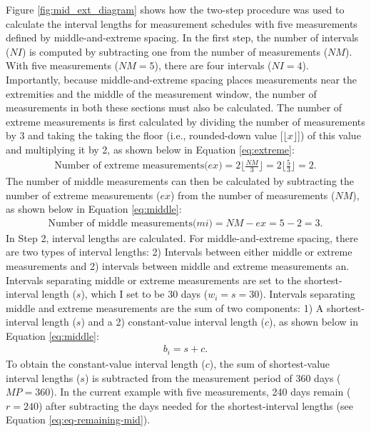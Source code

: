 \documentclass[
12pt, %
twoside,
english]{guelphthesis}
\begin{document}
Figure \ref{fig:mid_ext_diagram} shows how the two-step procedure was used to calculate the interval lengths for measurement schedules with five measurements defined
by middle-and-extreme spacing. In the first step, the number of intervals (\(NI\)) is computed by subtracting one from the number of measurements (\(NM\)). With five measurements (\(NM = 5\)), there are four intervals (\(NI = 4\)). Importantly, because middle-and-extreme spacing places measurements near the extremities and the middle of the measurement window, the number of measurements in both these sections must also be calculated. The number of extreme measurements is first calculated by dividing the number of measurements by 3 and taking the taking the floor (i.e., rounded-down value {[}\(\lfloor x\rfloor\){]}) of this value and multiplying it by 2, as shown below in Equation \ref{eq:extreme}:
\begin{align}
\text{Number of extreme measurements(} \textit{ex}\text{)} = 2\lfloor\frac{NM}{3}\rfloor = 2\lfloor\frac{5}{3}\rfloor = 2.
  \label{eq:extreme} 
\end{align}
\noindent The number of middle measurements can then be calculated by subtracting the number of extreme measurements (\(ex\)) from the number of measurements (\(NM\)), as shown below in Equation \ref{eq:middle}:
\begin{align}
\text{Number of middle measurements(} \textit{mi}\text{)} = NM - ex = 5 - 2 = 3.
  \label{eq:middle} 
\end{align}
In Step 2, interval lengths are calculated. For middle-and-extreme spacing, there are two types of interval lengths: 2) Intervals between either middle or extreme measurements and 2) intervals between middle and extreme measurements an. Intervals separating middle or extreme measurements are set to the shortest-interval length (\(s\)), which I set to be 30 days (\(w_i = s = 30\)). Intervals separating middle and extreme measurements are the sum of two components: 1) A shortest-interval length (\(s\)) and a 2) constant-value interval length (\(c\)), as shown below in Equation \ref{eq:middle}:
\begin{align}
b_i = s + c.
  \label{eq:middle} 
\end{align}
\noindent To obtain the constant-value interval length (\(c\)), the sum of shortest-value interval lengths (\(s\)) is subtracted from the measurement period of 360 days (\(MP = 360\)). In the current example with five measurements, 240 days remain (\(r = 240\)) after subtracting the days needed for the shortest-interval lengths (see Equation \ref{eq:eq-remaining-mid}).
\end{document}
